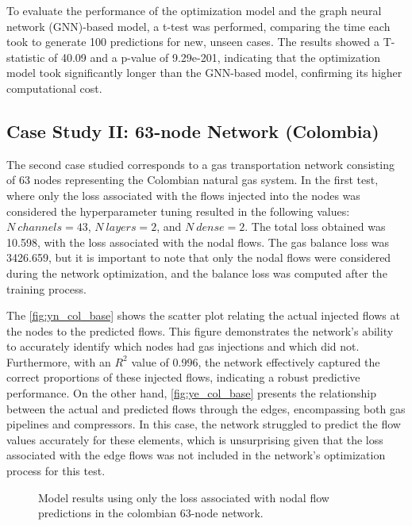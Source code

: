To evaluate the performance of the optimization model and the graph neural network (GNN)-based model, a t-test was performed, comparing the time each took to generate 100 predictions for new, unseen cases. The results showed a T-statistic of 40.09 and a p-value of 9.29e-201, indicating that the optimization model took significantly longer than the GNN-based model, confirming its higher computational cost.






\subsection{Case Study II: 63-node Network (Colombia)}


The second case studied corresponds to a gas transportation network consisting of 63 nodes representing the Colombian natural gas system. In the first test, where only the loss associated with the flows injected into the nodes was considered the hyperparameter tuning resulted in the following values: $N \ channels = 43$, $N \ layers = 2$, and $N \ dense = 2$. The total loss obtained was 10.598, with the loss associated with the nodal flows. The gas balance loss was 3426.659, but it is important to note that only the nodal flows were considered during the network optimization, and the balance loss was computed after the training process.

The \cref{fig:yn_col_base} shows the scatter plot relating the actual injected flows at the nodes to the predicted flows. This figure demonstrates the network's ability to accurately identify which nodes had gas injections and which did not. Furthermore, with an $R^2$ value of 0.996, the network effectively captured the correct proportions of these injected flows, indicating a robust predictive performance. 
On the other hand, \cref{fig:ye_col_base} presents the relationship between the actual and predicted flows through the edges, encompassing both gas pipelines and compressors. In this case, the network struggled to predict the flow values accurately for these elements, which is unsurprising given that the loss associated with the edge flows was not included in the network's optimization process for this test.

\begin{figure}
    \centering
        \setlength{}        
        \setlength{} 
    \caption{Model results using only the loss associated with nodal flow predictions in the colombian 63-node network.}\label{fig:colombian_base_results}
\end{figure}


